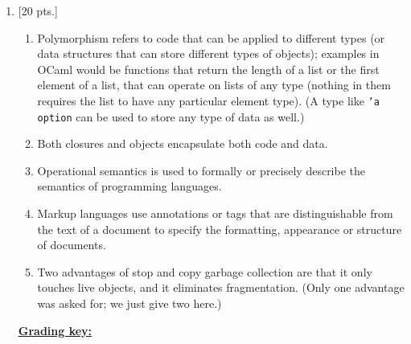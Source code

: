 \documentclass[11pt,fleqn]{article}
\begin{document}
  \begin{enumerate}

    \addtolength{\itemsep}{15mm}


    \item {[20 pts.]}

          \vspace{-2.5mm}

          \begin{enumerate}

            \addtolength{\itemsep}{4mm}

            \item Polymorphism refers to code that can be applied to
                  different types (or data structures that can store
                  different types of objects); examples in OCaml would be
                  functions that return the length of a list or the first
                  element of a list, that can operate on lists of any type
                  (nothing in them requires the list to have any particular
                  element type).  (A type like \texttt{'a option} can be
                  used to store any type of data as well.)

            \item Both closures and objects encapsulate both code and data.

            \item Operational semantics is used to formally or precisely
                  describe the semantics of programming languages.

            \item Markup languages use annotations or tags that are
                  distinguishable from the text of a document to specify the
                  formatting, appearance or structure of documents.

            \item Two advantages of stop and copy garbage collection are
                  that it only touches live objects, and it eliminates
                  fragmentation.  (Only one advantage was asked for; we just
                  give two here.)

          \end{enumerate}

          \vspace{-2.5mm}

          \begin{info}{\textbf{\underline{Grading key:}}}


\end{info}
\end{enumerate}
\end{document}
